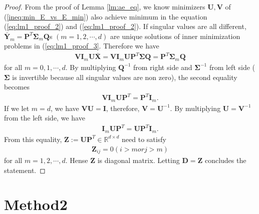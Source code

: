 \documentclass{article}
\begin{document}
    \begin{proof}
    From the proof of Lemma \ref{lm:ae_eq}, we know minimizers $\mathbf{U}, \mathbf{V}$ of (\ref{ineq:min_E_vs_E_min}) also achieve minimum in the equation (\ref{eq:lm1_proof_2}) and  (\ref{eq:lm1_proof_2}). If singular values are all different, $\bar{\mathbf{Y}}_m = \mathbf{P}^T \mathbf{\Sigma}_m \mathbf{Q}$s $(m=1,2,\cdots,d)$ are unique solutions of inner minimization problems in (\ref{eq:lm1_proof_3}. Therefore we have
    \begin{align}
        \mathbf{V} \mathbf{I}_m \mathbf{U} \bar{\mathbf{X}}
        = \mathbf{V} \mathbf{I}_m \mathbf{U} \mathbf{P}^T \mathbf{\Sigma} \mathbf{Q}
        = \mathbf{P}^T \mathbf{\Sigma}_m \mathbf{Q} \nonumber
    \end{align}
    for all $m=0, 1, \cdots, d$.
    By multiplying $\mathbf{Q}^{-1}$ from right side and $\mathbf{\Sigma}^{-1}$ from left side ($\mathbf{\Sigma}$ is invertible because all singular values are non zero), the second equality becomes
    \begin{align}
        \mathbf{V} \mathbf{I}_m \mathbf{U} \mathbf{P}^T
        = \mathbf{P}^T \mathbf{I}_m.
    \end{align}
    If we let $m = d$, we have $\mathbf{V} \mathbf{U} = \mathbf{I}$, therefore, $\mathbf{V} = \mathbf{U}^{-1}$. 
    By multiplying $\mathbf{U} = \mathbf{V}^{-1}$ from the left side, we have
    \begin{align}
        \mathbf{I}_m \mathbf{U} \mathbf{P}^T
        = \mathbf{U} \mathbf{P}^T \mathbf{I}_m.
    \end{align}
    From this equality, $\mathbf{Z} := \mathbf{U} \mathbf{P}^T \in \mathbb{R}^{d \times d}$ need to satisfy
    \begin{align}
        \mathbf{Z}_{ij} = 0 (i > m or j > m)
    \end{align}
    for all $m = 1, 2, \cdots, d$. Hense $\mathbf{Z}$ is diagonal matrix. Letting $\mathbf{D} = \mathbf{Z}$ concludes the statement.
    \end{proof}
    


    \section{Method2}
    \label{method}
\end{document}
